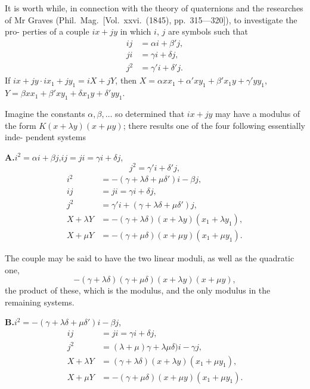 \documentclass[12pt,a4paper]{article}
\begin{document}
\bigskip
\setcounter{page}{128}

It is worth while, in connection with the theory of quaternions and the researches
of Mr Graves (Phil.\ Mag.\ [Vol.~xxvi.~(1845), pp.~315---320]), to investigate the pro-
perties of a couple $ix + jy$ in which $i$, $j$ are symbols such that
\begin{align*}
ij &= \alpha i + \beta' j,\\
ji &= \gamma i + \delta j,\\
j^2 &= \gamma' i + \delta' j.
\end{align*}
If $ix + jy \cdot ix_1 + jy_1 = iX + jY$,
then $X = \alpha xx_1 + \alpha' xy_1 + \beta' x_1y + \gamma' yy_1$,
$Y = \beta xx_1 + \beta' xy_1 + \delta x_1y + \delta' yy_1$.

Imagine the constants $\alpha, \beta, \ldots$ so determined that $ix + jy$ may have a modulus of
the form $K(x + \lambda y)(x + \mu y)$; there results one of the four following essentially inde-
pendent systems

\medskip
\textbf{A.}\quad $i^2 = \alpha i + \beta j$,\quad $ij = ji = \gamma i + \delta j$,
\[
j^2 = \gamma' i + \delta' j,
\]
\begin{align*}
i^2 &= -(\gamma + \lambda\delta + \mu\delta') i - \beta j,\\
ij &= ji = \gamma i + \delta j,\\
j^2 &= \gamma' i + (\gamma + \lambda\delta + \mu\delta')j,\\
X + \lambda Y &= -(\gamma + \lambda\delta)(x + \lambda y)(x_1 + \lambda y_1),\\
X + \mu Y &= -(\gamma + \mu\delta)(x + \mu y)(x_1 + \mu y_1).
\end{align*}

\newpage
\setcounter{page}{129}

The couple may be said to have the two linear moduli,
as well as the quadratic one,
\[-(\gamma + \lambda\delta)(\gamma + \mu\delta)(x + \lambda y)(x + \mu y),\]
the product of these, which is the modulus, and the only modulus in the remaining
systems.

\medskip
\textbf{B.}\quad $i^2 = -(\gamma + \lambda\delta + \mu\delta') i - \beta j$,
\begin{align*}
ij &= ji = \gamma i + \delta j,\\
j^2 &= (\lambda + \mu)\gamma + \lambda\mu\delta) i - \gamma j,\\
X + \lambda Y &= (\gamma + \lambda\delta)(x + \lambda y)(x_1 + \mu y_1),\\
X + \mu Y &= -(\gamma + \mu\delta)(x + \mu y)(x_1 + \mu y_1).
\end{align*}
\end{document}
